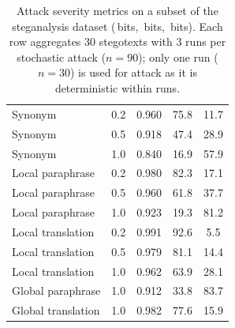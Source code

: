 \begin{table}
\begin{tabular}{llccc}
Synonym                 & 0.2 & 0.960 & 75.8 & 11.7 \\
Synonym                 & 0.5 & 0.918 & 47.4 & 28.9 \\
Synonym                 & 1.0 & 0.840 & 16.9 & 57.9 \\
Local paraphrase        & 0.2 & 0.980 & 82.3 & 17.1 \\
Local paraphrase        & 0.5 & 0.960 & 61.8 & 37.7 \\
Local paraphrase        & 1.0 & 0.923 & 19.3 & 81.2 \\
Local translation       & 0.2 & 0.991 & 92.6 &  5.5 \\
Local translation       & 0.5 & 0.979 & 81.1 & 14.4 \\
Local translation       & 1.0 & 0.962 & 63.9 & 28.1 \\
Global paraphrase       & 1.0 & 0.912 & 33.8 & 83.7 \\
Global translation      & 1.0 & 0.982 & 77.6 & 15.9 \\
\bottomrule
\end{tabular}
\caption{Attack severity metrics on a subset of the steganalysis dataset
(\,bits, \,bits, \,bits). Each row aggregates 30 stegotexts with 3 runs per stochastic attack ($n{=}90$); only one run ($n{=}30$) is used for \syn attack as it is deterministic within runs.}
\label{tab:attack-metrics}
\end{table}
